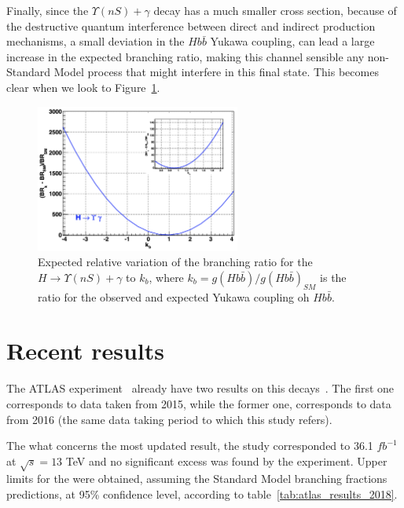 Finally, since the $\Upsilon(nS) + \gamma$ decay has a much smaller cross section, because of the destructive quantum interference between direct and indirect production mechanisms, a small deviation in the $Hb\bar{b}$ Yukawa coupling, can lead a large increase in the expected branching ratio, making this channel sensible any non-Standard Model process that might interfere in this final state. This becomes clear when we look to Figure~\ref{hbb_coup}.

\begin{figure}[!htbp]
  \begin{center}
  \includegraphics[width=0.6\textwidth ]{figures_and_tables/theory/hbb_coup.png}
  \end{center}\vspace*{-.5cm}
  \caption{Expected relative variation of the branching ratio for the $H \rightarrow \Upsilon(nS) + \gamma$ to $k_b$, where $k_b = g(Hb\bar{b})/g(Hb\bar{b})_{SM}$ is the ratio for the observed and expected Yukawa coupling oh $Hb\bar{b}$. \cite{PhysRevD.88.053003}}
  \label{hbb_coup}
  \end{figure}


\section{Recent results}

The ATLAS experiment~\cite{atlas_collaboration_2008} already have two results on this decays~\cite{atlas_paper:PhysRevLett.114.121801, atlas_paper_2018:2018txb}. The first one corresponds to data taken from 2015, while the former one, corresponds to data from 2016 (the same data taking period to which this study refers).

The what concerns the most updated result, the study corresponded to 36.1 $fb^{-1}$ at $\sqrt{s} = 13$ TeV and no significant excess was found by the experiment. Upper limits for the were obtained, assuming the Standard Model branching fractions predictions, at 95\% confidence level, according to table~\ref{tab:atlas_results_2018}.

